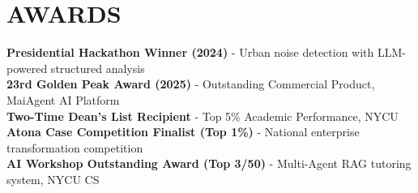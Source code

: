 \documentclass[letterpaper,11pt]{article}
\makeatletter
\newcommand{\resumeItem}[1]{
  \item\small{#1}
}
\newcommand{\resumeSubheading}[4]{
  \vspace{-1.5pt}\item
    \begin{tabular*}{1.0\textwidth}[t]{l@{\extracolsep{\fill}}r}
      \textbf{#1} \vspace{-1.5pt}& \textbf{\small #2} \\
      \textit{\small#3} & \textit{\small #4} \\
    \end{tabular*}
}
\newcommand{\resumeSubHeadingListStart}{\begin{itemize}[leftmargin=0.0in, label={}]}
\newcommand{\resumeSubHeadingListEnd}{\end{itemize}}
\newcommand{\resumeItemListStart}{\begin{itemize}[label=$\vcenter{\hbox{\tiny$\bullet$}}$]}
\newcommand{\resumeItemListEnd}{\end{itemize}}
\makeatother
\begin{document}

\section{AWARDS}
\noindent\small 
\textbf{Presidential Hackathon Winner (2024)} - Urban noise detection with LLM-powered structured analysis
\\ \textbf{23rd Golden Peak Award (2025)} - Outstanding Commercial Product, MaiAgent AI Platform
\\ \textbf{Two-Time Dean's List Recipient} - Top 5\% Academic Performance, NYCU
\\ \textbf{Atona Case Competition Finalist (Top 1\%)} - National enterprise transformation competition
\\ \textbf{AI Workshop Outstanding Award (Top 3/50)} - Multi-Agent RAG tutoring system, NYCU CS
\vspace{-2pt}
\end{document}
